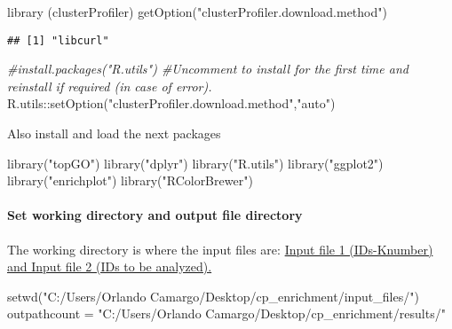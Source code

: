 \documentclass[
]{article}
\newenvironment{Shaded}{\begin{snugshade}}{\end{snugshade}}
\newcommand{\CommentTok}[1]{\textcolor[rgb]{0.56,0.35,0.01}{\textit{#1}}}
\newcommand{\FunctionTok}[1]{\textcolor[rgb]{0.00,0.00,0.00}{#1}}
\newcommand{\NormalTok}[1]{#1}
\newcommand{\OtherTok}[1]{\textcolor[rgb]{0.56,0.35,0.01}{#1}}
\newcommand{\SpecialCharTok}[1]{\textcolor[rgb]{0.00,0.00,0.00}{#1}}
\newcommand{\StringTok}[1]{\textcolor[rgb]{0.31,0.60,0.02}{#1}}
\begin{document}
\begin{Shaded}
\begin{Highlighting}[]
\FunctionTok{library}\NormalTok{ (clusterProfiler)}
\FunctionTok{getOption}\NormalTok{(}\StringTok{"clusterProfiler.download.method"}\NormalTok{)}
\end{Highlighting}
\end{Shaded}

\begin{verbatim}
## [1] "libcurl"
\end{verbatim}

\begin{Shaded}
\begin{Highlighting}[]
\CommentTok{\#install.packages("R.utils") \#Uncomment to install for the first time and reinstall if required (in case of error).}
\NormalTok{R.utils}\SpecialCharTok{::}\FunctionTok{setOption}\NormalTok{(}\StringTok{"clusterProfiler.download.method"}\NormalTok{,}\StringTok{"auto"}\NormalTok{)}
\end{Highlighting}
\end{Shaded}

Also install and load the next packages

\begin{Shaded}
\begin{Highlighting}[]
\FunctionTok{library}\NormalTok{(}\StringTok{"topGO"}\NormalTok{)}
\FunctionTok{library}\NormalTok{(}\StringTok{"dplyr"}\NormalTok{)}
\FunctionTok{library}\NormalTok{(}\StringTok{"R.utils"}\NormalTok{)}
\FunctionTok{library}\NormalTok{(}\StringTok{"ggplot2"}\NormalTok{)}
\FunctionTok{library}\NormalTok{(}\StringTok{"enrichplot"}\NormalTok{)}
\FunctionTok{library}\NormalTok{(}\StringTok{"RColorBrewer"}\NormalTok{)}
\end{Highlighting}
\end{Shaded}

\hypertarget{set-working-directory-and-output-file-directory}{%
\paragraph{Set working directory and output file
directory}\label{set-working-directory-and-output-file-directory}}

The working directory is where the input files are:
\href{https://github.com/OrlanC/cp_enrichment}{Input file 1
(IDs-Knumber) and Input file 2 (IDs to be analyzed).}

\begin{Shaded}
\begin{Highlighting}[]
\FunctionTok{setwd}\NormalTok{(}\StringTok{"C:/Users/Orlando Camargo/Desktop/cp\_enrichment/input\_files/"}\NormalTok{)}
\NormalTok{outpathcount }\OtherTok{=} \StringTok{"C:/Users/Orlando Camargo/Desktop/cp\_enrichment/results/"}
\end{Highlighting}
\end{Shaded}
\end{document}
